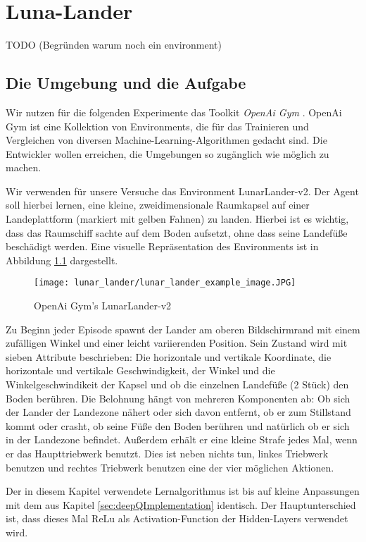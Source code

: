 \chapter{Luna-Lander}\label{sec:LunaLander}
TODO (Begründen warum noch ein environment)

\section{Die Umgebung und die Aufgabe}
Wir nutzen für die folgenden Experimente das Toolkit \textit{OpenAi Gym} \cite{x03_openaiGym}. OpenAi Gym ist eine Kollektion von Environments, die für das Trainieren und Vergleichen von diversen Machine-Learning-Algorithmen gedacht sind. Die Entwickler wollen erreichen, die Umgebungen so zugänglich wie möglich zu machen.

Wir verwenden für unsere Versuche das Environment \glqq LunarLander-v2\grqq{}. Der Agent soll hierbei lernen, eine kleine, zweidimensionale Raumkapsel auf einer Landeplattform (markiert mit gelben Fahnen) zu landen. Hierbei ist es wichtig, dass das Raumschiff sachte auf dem Boden aufsetzt, ohne dass seine Landefüße beschädigt werden. Eine visuelle Repräsentation des Environments ist in Abbildung \ref{img:lunarLanderExample} dargestellt.

\begin{figure}[h!]
    \centering
    \texttt{[image: lunar\_lander/lunar\_lander\_example\_image.JPG]}
    \caption{OpenAi Gym's \glqq LunarLander-v2\grqq{}} \label{img:lunarLanderExample}
\end{figure}

Zu Beginn jeder Episode spawnt der Lander am oberen Bildschirmrand mit einem zufälligen Winkel und einer leicht variierenden Position. Sein Zustand wird mit sieben Attribute beschrieben: Die horizontale und vertikale Koordinate, die horizontale und vertikale Geschwindigkeit, der Winkel und die Winkelgeschwindikeit der Kapsel und ob die einzelnen Landefüße (2 Stück) den Boden berühren. Die Belohnung hängt von mehreren Komponenten ab: Ob sich der Lander der Landezone nähert oder sich davon entfernt, ob er zum Stillstand kommt oder crasht, ob seine Füße den Boden berühren und natürlich ob er sich in der Landezone befindet. Außerdem erhält er eine kleine Strafe jedes Mal, wenn er das Haupttriebwerk benutzt. Dies ist neben nichts tun, linkes Triebwerk benutzen und rechtes Triebwerk benutzen eine der vier möglichen Aktionen.

Der in diesem Kapitel verwendete Lernalgorithmus ist bis auf kleine Anpassungen mit dem aus Kapitel \ref{sec:deepQImplementation} identisch. Der Hauptunterschied ist, dass dieses Mal ReLu als Activation-Function der Hidden-Layers verwendet wird.


